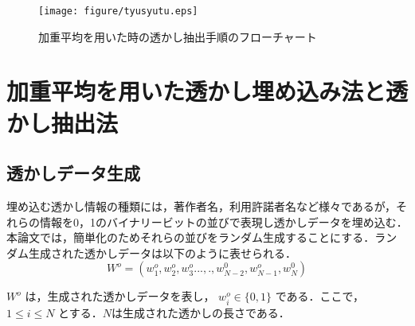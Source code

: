\documentclass[11pt]{jreport}
\begin{document}
{\begin{figure}[htbp]
  \begin{center}
    \texttt{[image: figure/tyusyutu.eps]}%
  \end{center}
  \caption{加重平均を用いた時の透かし抽出手順のフローチャート}
  \label{fig:ext}
\end{figure}





















\chapter{加重平均を用いた透かし埋め込み法と透かし抽出法}\label{chap:fig-tab-exp}

\section{透かしデータ生成}
埋め込む透かし情報の種類には，著作者名，利用許諾者名など様々であるが，それらの情報を0，1のバイナリービットの並びで表現し透かしデータを埋め込む．本論文では，簡単化のためそれらの並びをランダム生成することにする．ランダム生成された透かしデータは以下のように表せられる．
\begin{equation}
  W^o = (w^o_1,w^o_2,w^o_3...,.,w^0_{N-2},w^o_{N-1},w^0_N) \label{exp:sample}
\end{equation}

\begin{math}
 W^o
 \end{math}
は，生成された透かしデータを表し，
\begin{math}
 w^o_i \in \{0,1\}
 \end{math}
である．ここで，
\begin{math}
 1\le i \le N
 \end{math}
とする．\begin{math}N \end{math}は生成された透かしの長さである．

}
\end{document}
